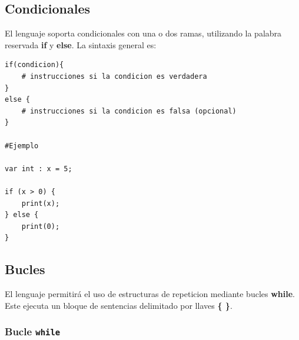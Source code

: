 \documentclass[12pt,a4paper]{article}
\begin{document}
\subsection{Condicionales}

El lenguaje soporta condicionales con una o dos ramas, utilizando la palabra reservada \textbf{if} y \textbf{else}.  
La sintaxis general es:

\begin{lstlisting}
if(condicion){
    # instrucciones si la condicion es verdadera
} 
else {
    # instrucciones si la condicion es falsa (opcional)
}

#Ejemplo

var int : x = 5;

if (x > 0) {
    print(x);
} else {
    print(0);
}

\end{lstlisting}



\subsection{Bucles}

El lenguaje  permitirá el uso de estructuras de repeticion mediante bucles \textbf{while}. Este ejecuta un bloque de sentencias delimitado por llaves \textbf{\{ \}}.







\subsubsection{Bucle \texttt{while}}
\end{document}
